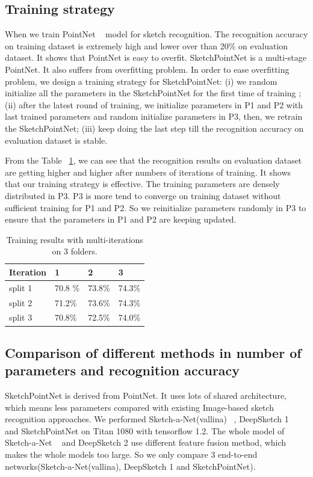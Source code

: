 \subsection{Training strategy}
\label{ssec:training_strategy}
When we train PointNet ~\cite{qi2017pointnet} model for sketch recognition. The recognition accuracy on training dataset is extremely high and lower over than 20\% on evaluation dataset. It shows that PointNet is easy to overfit. SketchPointNet is a multi-stage PointNet. It also suffers from overfitting problem. In order to ease overfitting problem, we design a training strategy for SketchPointNet: (i) we random initialize all the parameters in the SketchPointNet for the first time of training ; (ii) after the latest round of training, we initialize parameters in P1 and P2 with last trained parameters and random initialize parameters in P3, then, we retrain the SketchPointNet; (iii) keep doing the last step till the recognition accuracy on evaluation dataset is stable.

From the Table ~\ref{tbl:iteration}, we can see that the recognition results on evaluation dataset are getting higher and higher after numbers of iterations of training. It shows that our training strategy is effective. The training parameters are densely distributed in P3. P3 is more tend to converge on training dataset without sufficient training for P1 and P2. So we reinitialize parameters randomly in P3 to ensure that the parameters in P1 and P2 are keeping updated. 

\begin{table}[htbp]
\centering
\begin{tabular}{llll}
    \hline
     Iteration& 1&  2& 3\\
    \hline
     split 1& 70.8 \% & 73.8\% & 74.3\% \\
     split 2& 71.2\% & 73.6\% & 74.3\% \\
     split 3& 70.8\% & 72.5\% & 74.0\% \\
    \hline
\end{tabular}
\caption{Training results with multi-iterations on 3 folders.}
\label{tbl:iteration}
\end{table}

\subsection{Comparison of different methods in number of parameters and recognition accuracy}
\label{ssec:cm_speed}
SketchPointNet is derived from PointNet. It uses lots of shared architecture, which means less parameters compared with existing Image-based sketch recognition approaches. We performed Sketch-a-Net(vallina) ~\cite{Yu2015SketchaNetTB}, DeepSketch 1 ~\cite{Seddati2015DeepSketchDC} and SketchPointNet on Titan 1080 with tensorflow 1.2. The whole model of Sketch-a-Net ~\cite{Yu2015SketchaNetTB} and DeepSketch 2 \cite{Dupont2016DeepSketch2D} use different feature fusion method, which makes the whole models too large. So we only compare 3 end-to-end networks(Sketch-a-Net(vallina), DeepSketch 1 and SketchPointNet).

